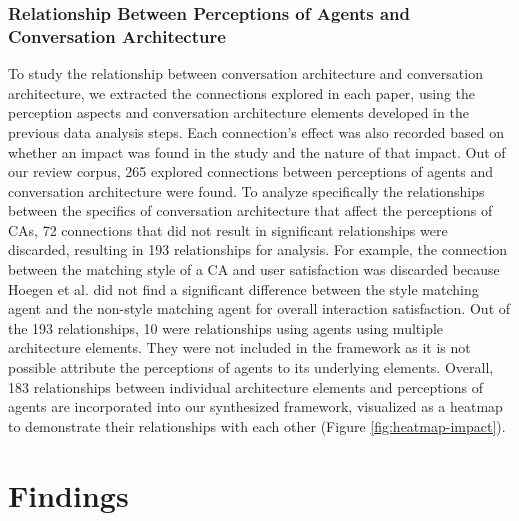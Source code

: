 \documentclass[sigconf,screen,review, anonymous]{acmart}
\newcommand{\cmt}[1]{}%
\begin{document}
\subsubsection*{Relationship Between Perceptions of Agents and Conversation Architecture}
To study the relationship between conversation architecture and conversation architecture, we extracted the connections explored in each paper, using the perception aspects and conversation architecture elements developed in the previous data analysis steps. Each connection's effect was also recorded based on whether an impact was found in the study and the nature of that impact. Out of our review corpus, 265 explored connections between perceptions of agents and conversation architecture were found. To analyze specifically the relationships between the specifics of conversation architecture that affect the perceptions of CAs, 72 connections that did not result in significant relationships were discarded, resulting in 193 relationships for analysis. For example, the connection between the matching style of a CA and user satisfaction was discarded because Hoegen et al. \cite{hoegen2019end}\cmt{[31]} did not find a significant difference between the style matching agent and the non-style matching agent for overall interaction satisfaction. Out of the 193 relationships, 10 were relationships using agents using multiple architecture elements. They were not included in the framework as it is not possible attribute the perceptions of agents to its underlying elements. Overall, 183 relationships between individual architecture elements and perceptions of agents are incorporated into our synthesized framework, visualized as a heatmap to demonstrate their relationships with each other (Figure \ref{fig:heatmap-impact}).


\section{Findings}
\end{document}
